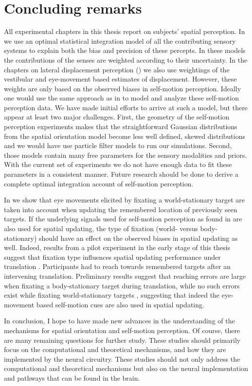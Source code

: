 \section{Concluding remarks}

All experimental chapters in this thesis report on subjects’ spatial perception. In  we use an optimal statistical integration model of all the contributing sensory systems to explain both the bias and precision of these percepts. In these models the contributions of the senses are weighted according to their uncertainty. In the chapters on lateral displacement perception () we also use weightings of the vestibular and eye-movement based estimates of displacement. However, these weights are only based on the observed biases in self-motion perception. Ideally one would use the same approach as in  to model and analyze these self-motion perception data. We have made initial efforts to arrive at such a model, but there appear at least two major challenges. First, the geometry of the self-motion perception experiments makes that the straightforward Gaussian distributions from the spatial orientation model become less well defined, skewed distributions and we would have use particle filter models to run our simulations. Second, those models contain many free parameters for the sensory modalities and priors. With the current set of experiments we do not have enough data to fit these parameters in a consistent manner. Future research should be done to derive a complete optimal integration account of self-motion perception.

In  we show that eye movements elicited by fixating a world-stationary target are taken into account when updating the remembered location of previously seen targets.  If the underlying signals used for self-motion perception as found in  are also used for spatial updating, the type of fixation (world- versus body-stationary) should have an effect on the observed biases in spatial updating as well. Indeed, results from a pilot experiment in the early stage of this thesis suggest that fixation type influences spatial updating performance under translation \cite{clemens2010}. Participants had to reach towards remembered targets after an intervening translation. Preliminary results suggest that reaching errors are large when fixating a body-stationary target during translation, while no such errors exist while fixating world-stationary targets \cite{clemens2010}, suggesting that indeed the eye-movement based self-motion cues are also used in spatial updating.

In conclusion, I hope to have made new advances in the understanding of the mechanisms for spatial orientation and self-motion perception. Of course, there are many remaining questions for further study. These studies should primarily focus on the computational and theoretical mechanisms, and how they are implemented by the neural circuitry. These studies should not only address the computational and theoretical mechanisms but also on the neural implementation and pathways that can be found in the brain.

 